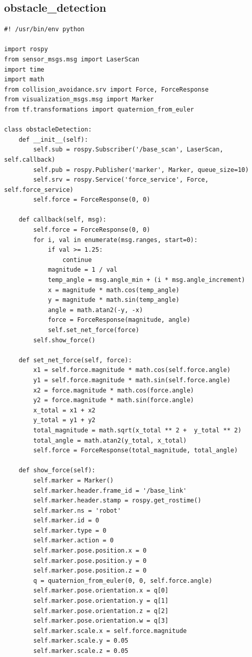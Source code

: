 \documentclass[Lau, binding=0.6cm, oneside]{sapthesis}
\begin{document}
\subsection{obstacle\_detection}
\begin{lstlisting}
#! /usr/bin/env python

import rospy
from sensor_msgs.msg import LaserScan
import time
import math
from collision_avoidance.srv import Force, ForceResponse
from visualization_msgs.msg import Marker
from tf.transformations import quaternion_from_euler

class obstacleDetection:
    def __init__(self):
        self.sub = rospy.Subscriber('/base_scan', LaserScan, self.callback)
        self.pub = rospy.Publisher('marker', Marker, queue_size=10)
        self.srv = rospy.Service('force_service', Force, self.force_service)
        self.force = ForceResponse(0, 0)

    def callback(self, msg):
        self.force = ForceResponse(0, 0)
        for i, val in enumerate(msg.ranges, start=0):
            if val >= 1.25:
                continue
            magnitude = 1 / val
            temp_angle = msg.angle_min + (i * msg.angle_increment)
            x = magnitude * math.cos(temp_angle)
            y = magnitude * math.sin(temp_angle)
            angle = math.atan2(-y, -x)
            force = ForceResponse(magnitude, angle)
            self.set_net_force(force)
        self.show_force()
    
    def set_net_force(self, force):
        x1 = self.force.magnitude * math.cos(self.force.angle)
        y1 = self.force.magnitude * math.sin(self.force.angle)
        x2 = force.magnitude * math.cos(force.angle)
        y2 = force.magnitude * math.sin(force.angle)
        x_total = x1 + x2
        y_total = y1 + y2
        total_magnitude = math.sqrt(x_total ** 2 +  y_total ** 2)
        total_angle = math.atan2(y_total, x_total)
        self.force = ForceResponse(total_magnitude, total_angle)

    def show_force(self):
        self.marker = Marker()
        self.marker.header.frame_id = '/base_link'
        self.marker.header.stamp = rospy.get_rostime()
        self.marker.ns = 'robot'
        self.marker.id = 0
        self.marker.type = 0
        self.marker.action = 0
        self.marker.pose.position.x = 0
        self.marker.pose.position.y = 0
        self.marker.pose.position.z = 0
        q = quaternion_from_euler(0, 0, self.force.angle)
        self.marker.pose.orientation.x = q[0]
        self.marker.pose.orientation.y = q[1]
        self.marker.pose.orientation.z = q[2]
        self.marker.pose.orientation.w = q[3]
        self.marker.scale.x = self.force.magnitude
        self.marker.scale.y = 0.05
        self.marker.scale.z = 0.05


\end{lstlisting}
\end{document}
